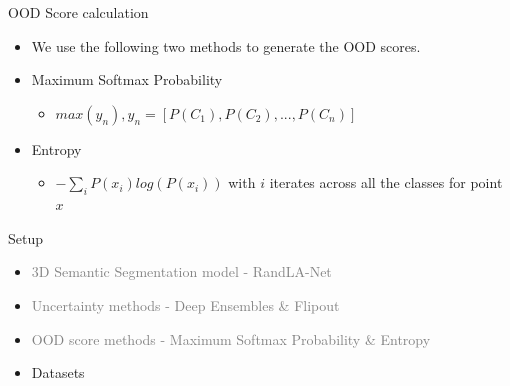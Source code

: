 \documentclass[aspectratio=169]{beamer}
\begin{document}
\begin{frame}{OOD Score calculation}
    \begin{itemize}
        \item We use the following two methods to generate the OOD scores.
        \item Maximum Softmax Probability
        \begin{itemize}
            \item $max(y_n), y_n = [P(C_1), P(C_2), ..., P(C_n)]$
        \end{itemize}
        \item Entropy
        \begin{itemize}
            \item $-\sum_i P(x_i)log(P(x_i))$ with $i$ iterates across all the classes for point $x$
        \end{itemize}
    \end{itemize}
\end{frame}
\begin{frame}[noframenumbering]{Setup}
    \begin{itemize}
        \item \textcolor{gray}{3D Semantic Segmentation model - RandLA-Net}
        \item \textcolor{gray}{Uncertainty methods - Deep Ensembles \& Flipout}
        \item \textcolor{gray}{OOD score methods - Maximum Softmax Probability \& Entropy}
        \item Datasets
    \end{itemize}
\end{frame}
\end{document}
